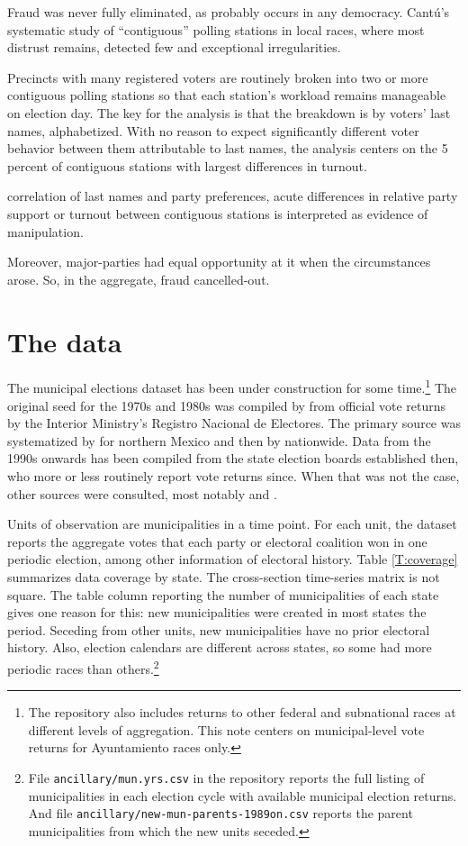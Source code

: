 \documentclass[letter,12pt]{article}
\begin{document}
Fraud was never fully eliminated, as probably occurs in any democracy. Cantú's \citeyearpar{cantuContiguas2014ajps} systematic study of ``contiguous'' polling stations in local races, where most distrust remains, detected few and exceptional irregularities. 

Precincts with many registered voters are routinely broken into two or more contiguous polling stations so that each station's workload remains manageable on election day. The key for the analysis is that the breakdown is by voters' last names, alphabetized. With no reason to expect significantly different voter behavior between them attributable to last names, the analysis centers on the 5 percent of contiguous stations with largest differences in turnout. 

correlation of last names and party preferences, acute differences in relative party support or turnout between contiguous stations is interpreted as evidence of manipulation.

Moreover, major-parties had equal opportunity at it when the circumstances arose. So, in the aggregate, fraud cancelled-out.

\section{The data}

The municipal elections dataset has been under construction for some time.\footnote{The repository also includes returns to other federal and subnational races at different levels of aggregation. This note centers on municipal-level vote returns for Ayuntamiento races only.} The original seed for the 1970s and 1980s was compiled by \citet{molinar.1991a} from official vote returns by the Interior Ministry's Registro Nacional de Electores. The primary source was systematized by \citet{magar.1994} for northern Mexico and then by \citet{varela.2004} nationwide. Data from the 1990s onwards has been compiled from the state election boards established then, who more or less routinely report vote returns since. When that was not the case, other sources were consulted, most notably \citet{revista.voz.y.voto} and \citet{cede.uam.izt}.

Units of observation are municipalities in a time point. For each unit, the dataset reports the aggregate votes that each party or electoral coalition won in one periodic election, among other information of electoral history. Table \ref{T:coverage} summarizes data coverage by state. The cross-section time-series matrix is not square. The table column reporting the number of municipalities of each state gives one reason for this: new municipalities were created in most states the period. Seceding from other units, new municipalities have no prior electoral history. Also, election calendars are different across states, so some had more periodic races than others.\footnote{File \verb|ancillary/mun.yrs.csv| in the repository reports the full listing of municipalities in each election cycle with available municipal election returns. And file \verb|ancillary/new-mun-parents-1989on.csv| reports the parent municipalities from which the new units seceded.}
\end{document}
